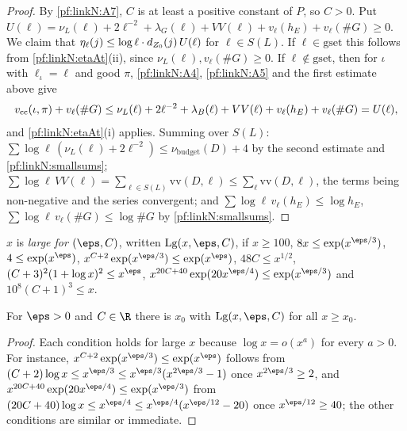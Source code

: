 \begin{proof}
By \ref{pf:linkN:A7}, $C$ is at least a positive constant of $P$, so $C>0$. Put
$U(\ell)=\nu_L(\ell)+2\ell^{-2}+\lambda_G(\ell)+VV(\ell)+v_\ell(h_E)+v_\ell(\#G)\ge0$. We claim that
$\eta_\ell(j)\le\log\ell\cdot d_{Z_0}(j)\,U(\ell)$ for $\ell\in S(L)$. If $\ell\in\mathrm{gset}$ this follows from
\cref{pf:linkN:etaAt}(ii), since $\nu_L(\ell),v_\ell(\#G)\ge0$. If $\ell\notin\mathrm{gset}$, then for $\iota$ with $\ell_\iota=\ell$ and
good $\pi$, \ref{pf:linkN:A4}, \ref{pf:linkN:A5} and the first estimate above give
\[
v_{\mathrm{cc}}(\iota,\pi)+v_\ell(\#G)\le\nu_L(\ell)+2\ell^{-2}+\lambda_B(\ell)+VV(\ell)+v_\ell(h_E)+v_\ell(\#G)=U(\ell),
\]
and \cref{pf:linkN:etaAt}(i) applies. Summing over $S(L)$: $\sum\log\ell\,(\nu_L(\ell)+2\ell^{-2})\le\nu_{\mathrm{budget}}(D)+4$ by the
second estimate and \cref{pf:linkN:smallsums}; $\sum\log\ell\,VV(\ell)=\sum_{\ell\in S(L)}\mathrm{vv}(D,\ell)\le\sum_\ell\mathrm{vv}(D,\ell)$,
the terms being non-negative and the series convergent; and $\sum\log\ell\,v_\ell(h_E)\le\log h_E$,
$\sum\log\ell\,v_\ell(\#G)\le\log\#G$ by \cref{pf:linkN:smallsums}.
\end{proof}

\begin{definition}\label{pf:linkN:Large}
$x$ is \emph{large for $(\eps,C)$}, written $\mathrm{Lg}(x,\eps,C)$, if $x\ge100$, $8x\le\exp(x^{\eps/3})$,
$4\le\exp(x^\eps)$, $x^{C+2}\exp(x^{\eps/3})\le\exp(x^\eps)$, $48C\le x^{1/2}$, $(C+3)^2(1+\log x)^2\le x^\eps$,
$x^{20C+40}\exp(20x^{\eps/4})\le\exp(x^{\eps/3})$ and $10^8(C+1)^3\le x$.
\end{definition}

\begin{lemma}\label{pf:linkN:largeev}
For $\eps>0$ and $C\in\R$ there is $x_0$ with $\mathrm{Lg}(x,\eps,C)$ for all $x\ge x_0$.
\end{lemma}

\begin{proof}
Each condition holds for large $x$ because $\log x=o(x^a)$ for every $a>0$. For instance,
$x^{C+2}\exp(x^{\eps/3})\le\exp(x^\eps)$ follows from $(C+2)\log x\le x^{\eps/3}\le x^{\eps/3}(x^{2\eps/3}-1)$ once
$x^{2\eps/3}\ge2$, and $x^{20C+40}\exp(20x^{\eps/4})\le\exp(x^{\eps/3})$ from $(20C+40)\log x\le x^{\eps/4}\le
x^{\eps/4}(x^{\eps/12}-20)$ once $x^{\eps/12}\ge40$; the other conditions are similar or immediate.
\end{proof}

